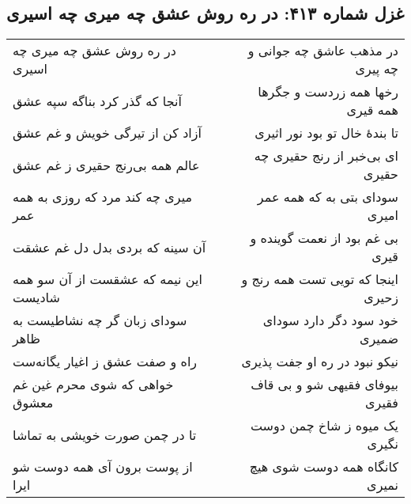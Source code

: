 \begin{center}
\section*{غزل شماره ۴۱۳: در ره روش عشق چه میری چه اسیری}
\label{sec:413}
\begin{longtable}{l p{0.5cm} r}
در ره روش عشق چه میری چه اسیری
&&
در مذهب عاشق چه جوانی و چه پیری
\\
آنجا که گذر کرد بناگه سپه عشق
&&
رخها همه زردست و جگرها همه قیری
\\
آزاد کن از تیرگی خویش و غم عشق
&&
تا بندهٔ خال تو بود نور اثیری
\\
عالم همه بی‌رنج حقیری ز غم عشق
&&
ای بی‌خبر از رنج حقیری چه حقیری
\\
میری چه کند مرد که روزی به همه عمر
&&
سودای بتی به که همه عمر امیری
\\
آن سینه که بردی بدل دل غم عشقت
&&
بی غم بود از نعمت گوینده و قیری
\\
این نیمه که عشقست از آن سو همه شادیست
&&
اینجا که تویی تست همه رنج و زحیری
\\
سودای زبان گر چه نشاطیست به ظاهر
&&
خود سود دگر دارد سودای ضمیری
\\
راه و صفت عشق ز اغیار یگانه‌ست
&&
نیکو نبود در ره او جفت پذیری
\\
خواهی که شوی محرم غین غم معشوق
&&
بیوفای فقیهی شو و بی قاف فقیری
\\
تا در چمن صورت خویشی به تماشا
&&
یک میوه ز شاخ چمن دوست نگیری
\\
از پوست برون آی همه دوست شو ایرا
&&
کانگاه همه دوست شوی هیچ نمیری
\\
\end{longtable}
\end{center}
